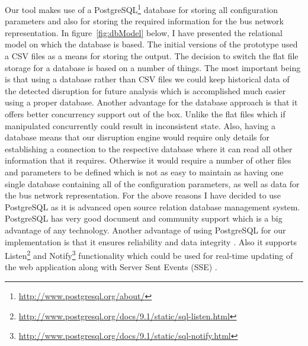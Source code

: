 Our tool makes use of a PostgreSQL\footnote{\url{http://www.postgresql.org/about/}} database for storing all configuration parameters and also for storing the required information for the bus network representation. In figure~\ref{fig:dbModel} below, I have presented the relational model on which the database is based. The initial versions of the prototype used a CSV files as a means for storing the output. The decision to switch the flat file storage for a database is based on a number of things. The most important being is that using a database rather than CSV files we could keep historical data of the detected disruption for future analysis which is accomplished much easier using a proper database. Another advantage for the database approach is that it offers better concurrency support out of the box. Unlike the flat files which if manipulated concurrently could result in inconsistent state. Also, having a database means that our disruption engine would require only details for establishing a connection to the respective database where it can read all other information that it requires. Otherwise it would require a number of other files and parameters to be defined which is not as easy to maintain as having one single database containing all of the configuration parameters, as well as data for the bus network representation. For the above reasons I have decided to use PostgreSQL as it is advanced open source relation database management system. PostgreSQL has very good document and community support which is a big advantage of any technology. Another advantage of using PostgreSQL for our implementation is that it ensures reliability and data integrity \cite{lerner2007open}. Also it supports Listen\footnote{\url{http://www.postgresql.org/docs/9.1/static/sql-listen.html}} and Notify\footnote{\url{http://www.postgresql.org/docs/9.1/static/sql-notify.html}} functionality which could be used for real-time updating of the web application along with Server Sent Events (SSE) \cite{serverSentEvents}.

